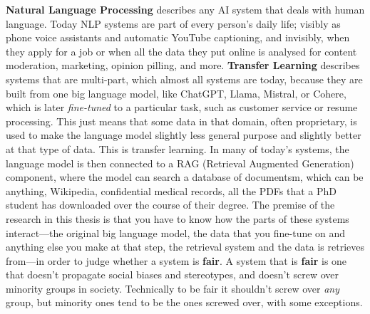 \documentclass[phd,ilcc,oneside,leftchapter,parskip]{infthesis}
\begin{document}
\begin{preliminary}

\maketitle

\begin{laysummary}
\textbf{Natural Language Processing} describes any AI system that deals with human language. Today NLP systems are part of every person's daily life; visibly as phone voice assistants and automatic YouTube captioning, and invisibly, when they apply for a job or when all the data they put online is analysed for content moderation, marketing, opinion pilling, and more. \textbf{Transfer Learning} describes systems that are multi-part, which almost all systems are today, because they are built from one big language model, like ChatGPT, Llama, Mistral, or Cohere, which is later \textit{fine-tuned} to a particular task, such as customer service or resume processing. This just means that some data in that domain, often proprietary, is used to make the language model slightly less general purpose and slightly better at that type of data. This is transfer learning. In many of today's systems, the language model is then connected to a RAG (Retrieval Augmented Generation) component, where the model can search a database of documentsm, which can be anything, Wikipedia, confidential medical records, all the PDFs that a PhD student has downloaded over the course of their degree. The premise of the research in this thesis is that you have to know how the parts of these systems interact---the original big language model, the data that you fine-tune on and anything else you make at that step, the retrieval system and the data is retrieves from---in order to judge whether a system is \textbf{fair}. A system that is \textbf{fair} is one that doesn't propagate social biases and stereotypes, and doesn't screw over minority groups in society. Technically to be fair it shouldn't screw over \textit{any} group, but minority ones tend to be the ones screwed over, with some exceptions. 


\end{laysummary}
\end{preliminary}
\end{document}
